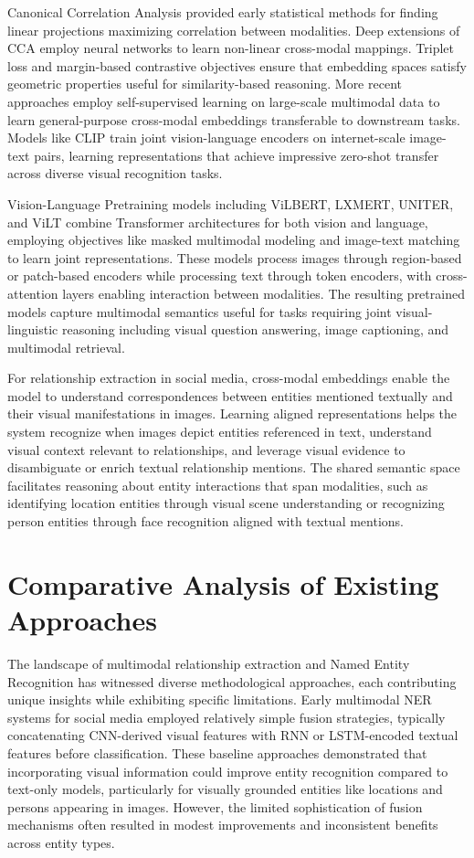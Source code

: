 \documentclass[12pt,a4paper]{report}
\begin{document}
Canonical Correlation Analysis provided early statistical methods for finding linear projections maximizing correlation between modalities. Deep extensions of CCA employ neural networks to learn non-linear cross-modal mappings. Triplet loss and margin-based contrastive objectives ensure that embedding spaces satisfy geometric properties useful for similarity-based reasoning. More recent approaches employ self-supervised learning on large-scale multimodal data to learn general-purpose cross-modal embeddings transferable to downstream tasks. Models like CLIP train joint vision-language encoders on internet-scale image-text pairs, learning representations that achieve impressive zero-shot transfer across diverse visual recognition tasks.

Vision-Language Pretraining models including ViLBERT, LXMERT, UNITER, and ViLT combine Transformer architectures for both vision and language, employing objectives like masked multimodal modeling and image-text matching to learn joint representations. These models process images through region-based or patch-based encoders while processing text through token encoders, with cross-attention layers enabling interaction between modalities. The resulting pretrained models capture multimodal semantics useful for tasks requiring joint visual-linguistic reasoning including visual question answering, image captioning, and multimodal retrieval.

For relationship extraction in social media, cross-modal embeddings enable the model to understand correspondences between entities mentioned textually and their visual manifestations in images. Learning aligned representations helps the system recognize when images depict entities referenced in text, understand visual context relevant to relationships, and leverage visual evidence to disambiguate or enrich textual relationship mentions. The shared semantic space facilitates reasoning about entity interactions that span modalities, such as identifying location entities through visual scene understanding or recognizing person entities through face recognition aligned with textual mentions.

\section{Comparative Analysis of Existing Approaches}

The landscape of multimodal relationship extraction and Named Entity Recognition has witnessed diverse methodological approaches, each contributing unique insights while exhibiting specific limitations. Early multimodal NER systems for social media employed relatively simple fusion strategies, typically concatenating CNN-derived visual features with RNN or LSTM-encoded textual features before classification. These baseline approaches demonstrated that incorporating visual information could improve entity recognition compared to text-only models, particularly for visually grounded entities like locations and persons appearing in images. However, the limited sophistication of fusion mechanisms often resulted in modest improvements and inconsistent benefits across entity types.
\end{document}

